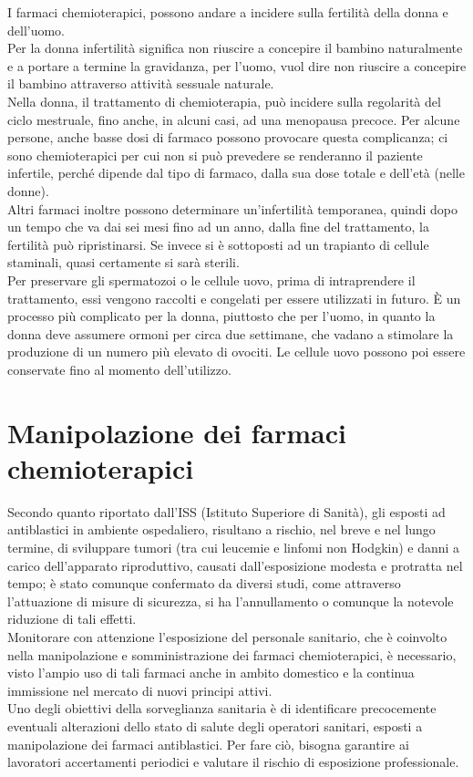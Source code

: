 I farmaci chemioterapici, possono andare a incidere sulla fertilità della donna e dell’uomo.\\ Per la donna infertilità 
significa non riuscire a concepire il bambino naturalmente e a portare a termine la gravidanza, 
per l’uomo, vuol dire non riuscire a concepire il bambino attraverso attività sessuale naturale\cite{AMERICANFERTILITY}.\\
Nella donna, il trattamento di chemioterapia, può incidere sulla regolarità del ciclo mestruale, fino anche, in alcuni casi, 
ad una menopausa precoce. Per alcune persone, anche basse dosi di farmaco possono provocare questa complicanza; 
ci sono chemioterapici per cui non si può prevedere se renderanno il paziente infertile, 
perché dipende dal tipo di farmaco, dalla sua dose totale e dell'età (nelle donne)\cite{UKFERTILITY}.\\
Altri farmaci inoltre possono determinare un'infertilità temporanea, quindi dopo un tempo che va dai sei mesi 
fino ad un anno, dalla fine del trattamento, la fertilità può ripristinarsi. 
Se invece si è sottoposti ad un trapianto di cellule staminali, quasi certamente si sarà sterili\cite{UKFERTILITY}.\\
Per preservare gli spermatozoi o le cellule uovo, prima di intraprendere il trattamento, essi vengono raccolti e 
congelati per essere utilizzati in futuro. È un processo più complicato per la donna, piuttosto che per l’uomo, 
in quanto la donna deve assumere ormoni per circa due settimane, che vadano a stimolare la produzione di un numero 
più elevato di ovociti. Le cellule uovo possono poi essere conservate fino al momento dell'utilizzo.

\section{Manipolazione dei farmaci chemioterapici}

Secondo quanto riportato dall'ISS (Istituto Superiore di Sanità), gli esposti ad antiblastici in ambiente 
ospedaliero, risultano a rischio, nel breve e nel lungo termine, di sviluppare tumori (tra cui leucemie e 
linfomi non Hodgkin) e danni a carico dell'apparato riproduttivo, causati dall'esposizione modesta e protratta nel 
tempo; è stato comunque confermato da diversi studi, come attraverso l'attuazione di misure di sicurezza, 
si ha l'annullamento o comunque la notevole riduzione di tali effetti\cite{ISSESPO}.\\
Monitorare con attenzione l'esposizione del personale sanitario, che è coinvolto nella manipolazione e 
somministrazione dei farmaci chemioterapici, è necessario, visto l'ampio uso di tali farmaci 
anche in ambito domestico e la continua immissione nel mercato di nuovi principi attivi.\\
Uno degli obiettivi della sorveglianza sanitaria è di identificare precocemente eventuali alterazioni dello stato 
di salute degli operatori sanitari, esposti a manipolazione dei farmaci antiblastici. Per fare ciò, 
bisogna garantire ai lavoratori accertamenti periodici e valutare il rischio di esposizione professionale\cite{ISSESPO}.\\

